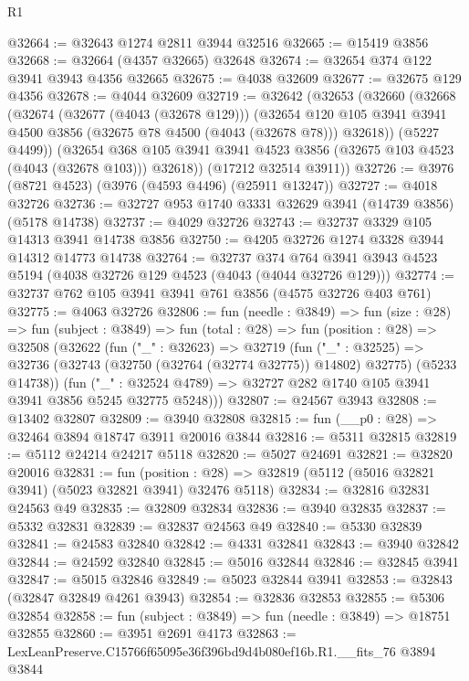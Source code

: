 \begin{lexlean}{R1}
\begin{coremodule}
@32664 := @32643 @1274 @2811 @3944 @32516
@32665 := @15419 @3856
@32668 := @32664 (@4357 @32665) @32648
@32674 := @32654 @374 @122 @3941 @3943 @4356 @32665
@32675 := @4038 @32609
@32677 := @32675 @129 @4356
@32678 := @4044 @32609
@32719 := @32642
    (@32653
      (@32660
        (@32668
          (@32674
            (@32677 (@4043 (@32678 @129)))
            (@32654
              @120
              @105
              @3941
              @3941
              @4500
              @3856
              (@32675 @78 @4500 (@4043 (@32678 @78)))
              @32618))
          (@5227 @4499))
        (@32654 @368 @105 @3941 @3941 @4523 @3856 (@32675 @103 @4523 (@4043 (@32678 @103))) @32618))
      (@17212 @32514 @3911))
@32726 := @3976 (@8721 @4523) (@3976 (@4593 @4496) (@25911 @13247))
@32727 := @4018 @32726
@32736 := @32727 @953 @1740 @3331 @32629 @3941 (@14739 @3856) (@5178 @14738)
@32737 := @4029 @32726
@32743 := @32737 @3329 @105 @14313 @3941 @14738 @3856
@32750 := @4205 @32726 @1274 @3328 @3944 @14312 @14773 @14738
@32764 := @32737
    @374
    @764
    @3941
    @3943
    @4523
    @5194
    (@4038 @32726 @129 @4523 (@4043 (@4044 @32726 @129)))
@32774 := @32737 @762 @105 @3941 @3941 @761 @3856 (@4575 @32726 @403 @761)
@32775 := @4063 @32726
@32806 := fun (needle : @3849) =>
  fun (size : @28) =>
  fun (subject : @3849) =>
  fun (total : @28) =>
  fun (position : @28) =>
  @32508
    (@32622
      (fun ("_" : @32623) =>
      @32719
        (fun ("_" : @32525) =>
        @32736 (@32743 (@32750 (@32764 (@32774 @32775)) @14802) @32775) (@5233 @14738))
        (fun ("_" : @32524 @4789) => @32727 @282 @1740 @105 @3941 @3941 @3856 @5245 @32775 @5248)))
@32807 := @24567 @3943
@32808 := @13402 @32807
@32809 := @3940 @32808
@32815 := fun (__p0 : @28) => @32464 @3894 @18747 @3911 @20016 @3844
@32816 := @5311 @32815
@32819 := @5112 @24214 @24217 @5118
@32820 := @5027 @24691
@32821 := @32820 @20016
@32831 := fun (position : @28) =>
  @32819 (@5112 (@5016 @32821 @3941) (@5023 @32821 @3941) @32476 @5118)
@32834 := @32816 @32831 @24563 @49
@32835 := @32809 @32834
@32836 := @3940 @32835
@32837 := @5332 @32831
@32839 := @32837 @24563 @49
@32840 := @5330 @32839
@32841 := @24583 @32840
@32842 := @4331 @32841
@32843 := @3940 @32842
@32844 := @24592 @32840
@32845 := @5016 @32844
@32846 := @32845 @3941
@32847 := @5015 @32846
@32849 := @5023 @32844 @3941
@32853 := @32843 (@32847 @32849 @4261 @3943)
@32854 := @32836 @32853
@32855 := @5306 @32854
@32858 := fun (subject : @3849) => fun (needle : @3849) => @18751 @32855
@32860 := @3951 @2691 @4173
@32863 := LexLeanPreserve.C15766f65095e36f396bd9d4b080ef16b.R1.__fits_76 @3894 @3844

\end{coremodule}
\end{lexlean}
